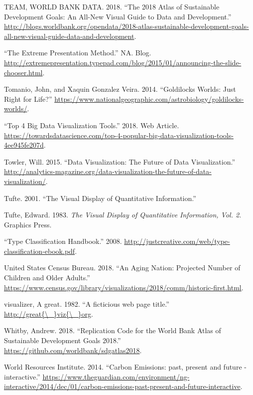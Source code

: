\documentclass[]{book}
\begin{document}
\hypertarget{ref-world_bank_data}{}
TEAM, WORLD BANK DATA. 2018. ``The 2018 Atlas of Sustainable Development
Goals: An All-New Visual Guide to Data and Development.''
\url{http://blogs.worldbank.org/opendata/2018-atlas-sustainable-development-goals-all-new-visual-guide-data-and-development}.

\hypertarget{ref-extremepre}{}
``The Extreme Presentation Method.'' NA. Blog.
\url{http://extremepresentation.typepad.com/blog/2015/01/announcing-the-slide-chooser.html}.

\hypertarget{ref-goldilocks_worlds}{}
Tomanio, John, and Xaquin Gonzalez Veira. 2014. ``Goldilocks Worlds:
Just Right for Life?''
\url{https://www.nationalgeographic.com/astrobiology/goldilocks-worlds/}.

\hypertarget{ref-top4_viz_tools}{}
``Top 4 Big Data Visualization Tools.'' 2018. Web Article.
\url{https://towardsdatascience.com/top-4-popular-big-data-visualization-tools-4ee945fe207d}.

\hypertarget{ref-future_viz}{}
Towler, Will. 2015. ``Data Visualization: The Future of Data
Visualization.''
\url{http://analytics-magazine.org/data-visualization-the-future-of-data-visualization/}.

\hypertarget{ref-Tufte_2001}{}
Tufte. 2001. ``The Visual Display of Quantitative Information.''

\hypertarget{ref-visual_display}{}
Tufte, Edward. 1983. \emph{The Visual Display of Quantitative
Information, Vol. 2.} Graphics Press.

\hypertarget{ref-type_class}{}
``Type Classification Handbook.'' 2008.
\url{http://justcreative.com/web/type-classification-ebook.pdf}.

\hypertarget{ref-aging_nation}{}
United States Census Bureau. 2018. ``An Aging Nation: Projected Number
of Children and Older Adults.''
\url{https://www.census.gov/library/visualizations/2018/comm/historic-first.html}.

\hypertarget{ref-great_viz}{}
visualizer, A great. 1982. ``A ficticious web page title.''
\href{http://great\%7B/_\%7Dviz\%7B/_\%7Dorg}{http://great\{\textbackslash{}\_\}viz\{\textbackslash{}\_\}org}.

\hypertarget{ref-worldbankcode}{}
Whitby, Andrew. 2018. ``Replication Code for the World Bank Atlas of
Sustainable Development Goals 2018.''
\url{https://github.com/worldbank/sdgatlas2018}.

\hypertarget{ref-CO2_emission}{}
World Resources Institute. 2014. ``Carbon Emissions: past, present and
future - interactive.''
\url{https://www.theguardian.com/environment/ng-interactive/2014/dec/01/carbon-emissions-past-present-and-future-interactive}.
\end{document}
